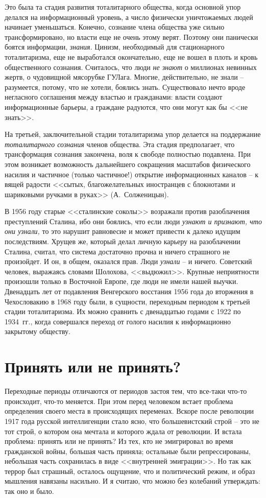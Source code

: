 \documentclass{book}
\begin{document}
Это была та стадия развития тоталитарного общества, когда основной упор делался на информационный уровень, а число физически уничтожаемых людей начинает уменьшаться. Конечно, сознание члена общества уже сильно трансформировано, но власти еще не очень этому верят. Поэтому они панически боятся информации, \textit{знания}.  Цинизм, необходимый для стационарного тоталитаризма, еще не выработался окончательно, еще не вошел в плоть и кровь общественного сознания. Считалось, что люди \textit{не знают} о  миллионах невинных жертв, о чудовищной мясорубке ГУЛага. Многие, действительно, не знали -- разумеется, потому, что не хотели, боялись знать. Существовало нечто вроде негласного соглашения между властью и гражданами: власти создают информационные барьеры, а граждане радуются, что они могут как бы <<не знать>>.

На третьей, заключительной стадии тоталитаризма упор делается на поддержание \textit{тоталитарного сознания} членов об­щества. Эта стадия предполагает, что трансформация сознания закончена, воля к свободе полностью подавлена. При этом возникает возможность дальнейшего сокращения масштабов физического насилия и частичное (только частичное!) открытие информационных каналов -- к вящей радости <<сытых, благожелательных иностранцев с блокнотами и шариковыми ручками в руках>> (А.~Солженицын).

В 1956 году старые <<сталинские соколы>> возражали про­тив разоблачения преступлений Сталина, ибо они боялись, что если люди \textit{узнают и признают, что они узнали,}  то это нарушит равновесие и может привести к далеко идущим последствиям. Хрущев же, который делал личную карьеру на разоблачении Сталина, считал, что система достаточно прочна и ничего страшного не произойдет. И он, в общем, оказался прав. Люди \textit{узнали} -- и  ничего. Советский человек, выражаясь словами Шолохова, <<выдюжил>>. Крупные неприятности произошли только в Восточной Европе, где люди не имели нашей выучки. Двенадцать лет от подавления Венгерского восстания 1956 года до вторжения в Чехословакию в 1968 году были, в сущности, переходным периодом к третьей стадии тоталитаризма. Их можно сравнить с двенадцатью годами с 1922 по 1934~гг., ко­гда совершался переход от голого насилия к информационно закрытому обществу.

\section{Принять или не принять?}

Переходные периоды отличаются от периодов застоя тем, что все-таки что-то происходит, что-то меняется. При этом перед человеком встает проблема определения своего места в происходящих переменах. Вскоре после революции 1917 го­да русской интеллигенции стало ясно, что большевистский строй -- это не тот строй, о котором она мечтала и которого ждала от революции. И встала проблема: принять или не при­нять? Из тех, кто не эмигрировал во время гражданской вой­ны, большая часть приняла; остальные были репрессированы, небольшая часть сохранилась в виде <<внутренней эмиграции>>. Но так как террор был страшный, осталось ощущение, что и политический режим, и образ мышления навязаны насильно. И я считаю, что можно без колебаний утверждать: так оно и было.
\end{document}
